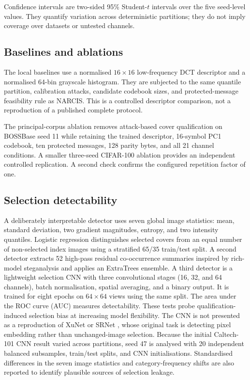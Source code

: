 ﻿\documentclass[a4paper,fleqn]{cas-dc}
\newcommand{\method}{NARCIS\xspace}
\begin{document}
Confidence intervals are two-sided 95\% Student-$t$ intervals over the five
seed-level values. They quantify variation across deterministic partitions;
they do not imply coverage over datasets or untested channels.

\subsection{Baselines and ablations}

The local baselines use a normalised $16\times16$ low-frequency DCT descriptor
and a normalised 64-bin grayscale histogram. They are subjected to the same
quantile partition, calibration attacks, candidate codebook sizes, and
protected-message feasibility rule as \method. This is a controlled descriptor
comparison, not a reproduction of a published complete protocol.

The principal-corpus ablation removes attack-based cover qualification on
BOSSBase seed 11 while retaining the trained descriptor, 16-symbol PC1
codebook, ten protected messages, 128 parity bytes, and all 21 channel
conditions. A smaller three-seed CIFAR-100 ablation provides an independent
controlled replication. A second check confirms the configured repetition
factor of one.

\subsection{Selection detectability}

A deliberately interpretable detector uses seven global image statistics:
mean, standard deviation, two gradient magnitudes, entropy, and two intensity
quantiles. Logistic regression distinguishes selected covers from an equal
number of non-selected index images using a stratified 65/35 train/test split.
A second detector extracts 52 high-pass residual co-occurrence summaries
inspired by rich-model steganalysis \cite{fridrich2012rich} and applies an
ExtraTrees ensemble. A third detector is a lightweight selection CNN with
three convolutional stages (16, 32, and 64 channels), batch normalisation,
spatial averaging, and a binary output. It is trained for eight epochs on
$64\times64$ views using the same split. The area under the ROC curve (AUC)
measures detectability. These tests probe qualification-induced selection
bias at increasing model flexibility. The CNN is not presented as a
reproduction of XuNet or SRNet \cite{xu2016steganalysis,boroumand2018srnet},
whose original task is detecting pixel embedding rather than unchanged-image
selection. Because the initial Caltech-101 CNN result varied across
partitions, seed 47 is analysed with 20 independent balanced subsamples,
train/test splits, and CNN initialisations. Standardised differences in the
seven image statistics and category-frequency shifts are also reported to
identify plausible sources of selection leakage.
\end{document}
